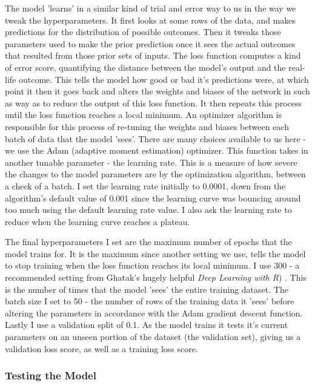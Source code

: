 The model 'learns' in a similar kind of trial and error way to us in the way we tweak the hyperparameters. It first looks at some rows of the data, and makes predictions for the distribution of possible outcomes. Then it tweaks those parameters used to make the prior prediction once it sees the actual outcomes that resulted from those prior sets of inputs. The loss function computes a kind of error score, quantifying the distance between the model's output and the real-life outcome. This tells the model how good or bad it's predictions were, at which point it then it goes back and alters the weights and biases of the network in such as way as to reduce the output of this loss function. It then repeats this process until the loss function reaches a local minimum. An optimizer algorithm is responsible for this process of re-tuning the weights and biases between each batch of data that the model 'sees'. There are many choices available to us here - we use the Adam (adaptive moment estimation) optimizer. This function takes in another tunable parameter - the learning rate. This is a measure of how severe the changes to the model parameters are by the optimization algorithm, between a check of a batch. I set the learning rate initially to 0.0001, down from the algorithm's default value of 0.001 since the learning curve was bouncing around too much using the default learning rate value. I also ask the learning rate to reduce when the learning curve reaches a plateau. 

The final hyperparameters I set are the maximum number of epochs that the model trains for. It is the maximum since another setting we use, tells the model to stop training when the loss function reaches its local minimum. I use 300 - a recommended setting from Ghatak's hugely helpful \textit{Deep Learning with R}) \cite{ghatak_deep_2019}. This is the number of times that the model 'sees' the entire training dataset. The batch size I set to 50 - the number of rows of the training data it 'sees' before altering the parameters in accordance with the Adam gradient descent function. Lastly I use a validation split of 0.1. As the model trains it tests it's current parameters on an unseen portion of the dataset (the validation set), giving us a validation loss score, as well as a training loss score.

\subsubsection{Testing the Model}

